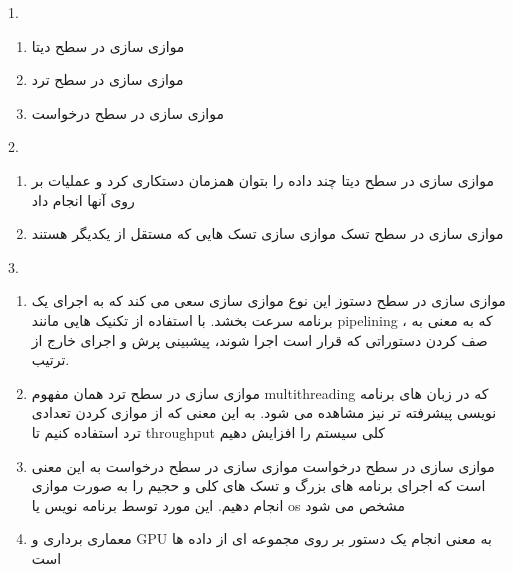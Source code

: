 1.
\begin{enumerate}[label=\arabic*)]
  \item موازی سازی در سطح دیتا
  \item موازی سازی در سطح ترد
  \item موازی سازی در سطح درخواست
\end{enumerate}
2.
\begin{enumerate}[label=\arabic*)]
  \item موازی سازی در سطح دیتا
  \newline
  چند داده را بتوان همزمان دستکاری کرد و عملیات بر روی آنها انجام داد
  \item موازی سازی در سطح تسک
  \newline
  موازی سازی تسک هایی که مستقل از یکدیگر هستند
\end{enumerate}
3.
\begin{enumerate}[label=\arabic*)]
  \item موازی سازی در سطح دستوز
  \newline
  این نوع موازی سازی سعی می کند که به اجرای یک برنامه سرعت بخشد. با استفاده از تکنیک هایی مانند 
  pipelining
  ، که به معنی به صف کردن دستوراتی که قرار است اجرا شوند،
  پیشبینی پرش و اجرای خارج از ترتیب.
  \item موازی سازی در سطح ترد
  \newline
  همان مفهوم 
  multithreading
  که در زبان های برنامه نویسی پیشرفته تر نیز مشاهده می شود. به این معنی که از موازی کردن تعدادی ترد استفاده کنیم تا 
  throughput
  کلی سیستم را افزایش دهیم
  \item موازی سازی در سطح درخواست
  \newline
  موازی سازی در سطح درخواست به این معنی است که اجرای برنامه های بزرگ و تسک های کلی و حجیم را به صورت موازی انجام دهیم. این مورد توسط برنامه نویس یا 
  os
  مشخص می شود
  \item معماری برداری و GPU
  \newline
  به معنی انجام یک دستور بر روی مجموعه ای از داده ها است
\end{enumerate}